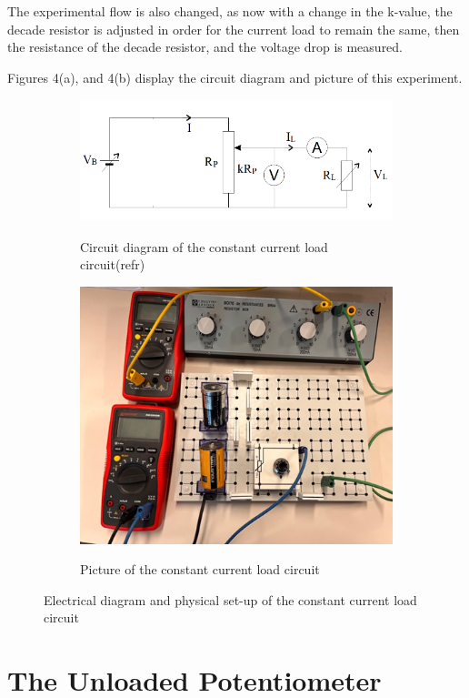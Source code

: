 \documentclass[a4paper]{article}
\begin{document}
The experimental flow is also changed, as now with a change in the k-value, the
decade resistor is adjusted in order for the current load to remain the same,
then the resistance of the decade resistor, and the voltage drop is measured.

Figures 4(a), and 4(b) display the circuit diagram and picture of this
experiment.

\begin{figure}[!ht]
    \centering
    \begin{subfigure}{.5\textwidth}
        \centering
        \includegraphics[width = 0.8\linewidth]{fixed current circuit.png}
        \label{fig:4a}
        \caption{Circuit diagram of the constant current load circuit(refr)}
        
    \end{subfigure}%
    \begin{subfigure}{.5\textwidth}
        \centering
        \includegraphics[width = 0.8\linewidth]{fixed currrent picture.png}
        \label{fig:4b}
        \caption{Picture of the constant current load circuit}
    \end{subfigure}
    \caption{Electrical diagram and physical set-up of the constant current load circuit}
\end{figure}
\section{The Unloaded Potentiometer}
\end{document}
